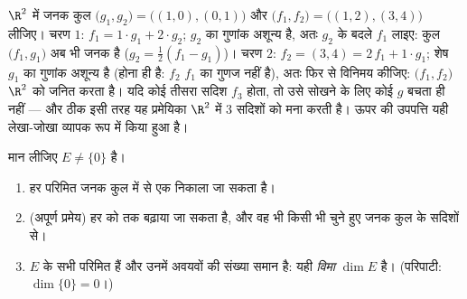 \begin{example}[विनिमय, एक बार देखकर]
\label{ex:b1:findim:exchangerun}
$\R^2$ में जनक कुल $\bigl(g_1, g_2\bigr) = \bigl((1,0), (0,1)\bigr)$ और
 $\bigl(f_1, f_2\bigr) = \bigl((1,2), (3,4)\bigr)$ लीजिए। चरण
$1$: $f_1 = 1\cdot g_1 + 2\cdot g_2$; $g_2$ का गुणांक अशून्य है, अतः $g_2$
के बदले $f_1$ लाइए: कुल $\bigl(f_1, g_1\bigr)$ अब भी जनक है ($g_2 =
\frac12(f_1 - g_1)$)। चरण $2$: $f_2 = (3,4) = 2\,f_1 + 1\cdot g_1$; शेष
$g_1$ का गुणांक अशून्य है (होना ही है: $f_2$ $f_1$ का गुणज नहीं है), अतः फिर
से विनिमय कीजिए: $\bigl(f_1, f_2\bigr)$ $\R^2$ को जनित करता है। यदि कोई
तीसरा  सदिश $f_3$ होता, तो उसे सोखने के लिए कोई $g$ बचता ही नहीं ---
और ठीक इसी तरह यह प्रमेयिका $\R^2$ में $3$  सदिशों को मना करती है।
ऊपर की उपपत्ति यही लेखा-जोखा व्यापक रूप में किया हुआ है।
\end{example}

\begin{theorem}[परिमित विमा में आधार]\label{thm:b1:findim:bases}
मान लीजिए $E \neq \{0\}$  है।
\begin{enumerate}
  \item हर परिमित जनक कुल में से एक  निकाला जा सकता है।
  \item (अपूर्ण  प्रमेय) हर  को
   तक बढ़ाया जा सकता है, और वह भी किसी भी चुने हुए जनक कुल के सदिशों से।
  \item $E$ के सभी  परिमित हैं और उनमें अवयवों की संख्या समान है: यही
  \emph{विमा} $\dim E$ है। (परिपाटी: $\dim\{0\} = 0$।)
\end{enumerate}
\end{theorem}

